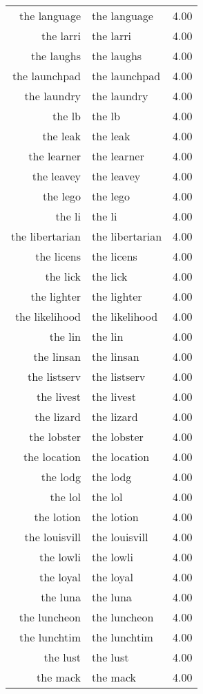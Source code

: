 \begin{table}[ht]
\begin{tabular}{rlr}
  the language & the language & 4.00 \\ 
  the larri & the larri & 4.00 \\ 
  the laughs & the laughs & 4.00 \\ 
  the launchpad & the launchpad & 4.00 \\ 
  the laundry & the laundry & 4.00 \\ 
  the lb & the lb & 4.00 \\ 
  the leak & the leak & 4.00 \\ 
  the learner & the learner & 4.00 \\ 
  the leavey & the leavey & 4.00 \\ 
  the lego & the lego & 4.00 \\ 
  the li & the li & 4.00 \\ 
  the libertarian & the libertarian & 4.00 \\ 
  the licens & the licens & 4.00 \\ 
  the lick & the lick & 4.00 \\ 
  the lighter & the lighter & 4.00 \\ 
  the likelihood & the likelihood & 4.00 \\ 
  the lin & the lin & 4.00 \\ 
  the linsan & the linsan & 4.00 \\ 
  the listserv & the listserv & 4.00 \\ 
  the livest & the livest & 4.00 \\ 
  the lizard & the lizard & 4.00 \\ 
  the lobster & the lobster & 4.00 \\ 
  the location & the location & 4.00 \\ 
  the lodg & the lodg & 4.00 \\ 
  the lol & the lol & 4.00 \\ 
  the lotion & the lotion & 4.00 \\ 
  the louisvill & the louisvill & 4.00 \\ 
  the lowli & the lowli & 4.00 \\ 
  the loyal & the loyal & 4.00 \\ 
  the luna & the luna & 4.00 \\ 
  the luncheon & the luncheon & 4.00 \\ 
  the lunchtim & the lunchtim & 4.00 \\ 
  the lust & the lust & 4.00 \\ 
  the mack & the mack & 4.00 \\ 

\end{tabular}
\end{table}
